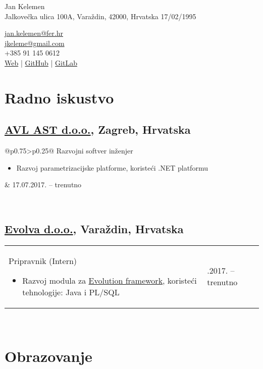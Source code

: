 \documentclass[a4paper]{article}
\makeatletter
\newlength{\tablewidth}
\newenvironment{period}[2]{%
\newcommand{\sarma}{#2}%
\setlength{\tablewidth}{\linewidth}
\addtolength{\tablewidth}{-2\tabcolsep}
\begin{tabular}{@{}p{0.75\tablewidth}>{\raggedleft\arraybackslash}p{0.25\tablewidth}@{}}%
#1 \newline
\begin{itemize}
}{%
\end{itemize} & \sarma \\%
\end{tabular}\\
}
\makeatother
\begin{document}
\fontfamily{\sfdefault}
\selectfont

\begin{minipage}{.5\textwidth}
\LARGE{Jan Kelemen}\\
\normalsize{Jalkove\v{c}ka ulica 100A, Vara\v{z}din, 42000, Hrvatska}
\normalsize{17/02/1995}
\end{minipage}%
\begin{minipage}{.5\textwidth}
\raggedleft
\href{mailto:jan.kelemen@fer.hr}{jan.kelemen@fer.hr} \\
\href{mailto:jkeleme@gmail.com}{jkeleme@gmail.com} \\
+385 91 145 0612 \\
\href{http://jan-kelemen.github.io/}{Web} | \href{https://github.com/jan-kelemen}{GitHub} | \href{https://gitlab.com/jan-kelemen}{GitLab}
\end{minipage}

\vspace{1em}

\section{Radno iskustvo}
\subsection{\href{https://www.avl.com/}{AVL AST d.o.o.}, Zagreb, Hrvatska}
\begin{period}{Razvojni softver in\v{z}enjer}{17.07.2017. -- trenutno}
	\item
		Razvoj parametrizacijske platforme, koriste\'{c}i .NET platformu
\end{period}
\subsection{\href{http://www.evolva.hr/hr/index.html}{Evolva d.o.o.}, Vara\v{z}din, Hrvatska}
\begin{period}{Pripravnik (Intern)}{22.08.2016. -- 23.09.2016.}
	\item
		Razvoj modula za \href{http://www.evolution-framework.com/}{Evolution framework}, koriste\'{c}i tehnologije: Java i PL/SQL
\end{period}

\section{Obrazovanje}
\end{document}
